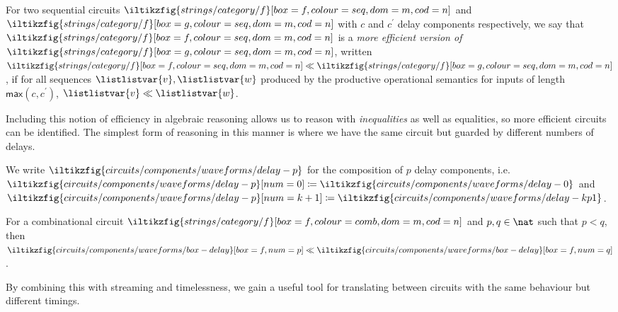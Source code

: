 \documentclass{lmcs}
\begin{document}
\begin{defi}
    For two sequential circuits \(
    \iltikzfig{strings/category/f}[box=f,colour=seq,dom=m,cod=n]
    \) and \(
    \iltikzfig{strings/category/f}[box=g,colour=seq,dom=m,cod=n]
    \) with \(c\) and \(c^\prime\) delay components respectively, we say that \(
    \iltikzfig{strings/category/f}[box=f,colour=seq,dom=m,cod=n]
    \) is a \emph{more efficient version of} \(
    \iltikzfig{strings/category/f}[box=g,colour=seq,dom=m,cod=n]
    \), written \(
    \iltikzfig{strings/category/f}[box=f,colour=seq,dom=m,cod=n]
    \ll
    \iltikzfig{strings/category/f}[box=g,colour=seq,dom=m,cod=n]
    \), if for all sequences \(\listlistvar{v},\listlistvar{w}\) produced by the
    productive operational semantics for inputs of length
    \(\mathsf{max}(c,c^\prime)\),  \(\listlistvar{v} \ll \listlistvar{w}\).
\end{defi}

Including this notion of efficiency in algebraic reasoning allows us to reason
with \emph{inequalities} as well as equalities, so more efficient circuits can
be identified.
The simplest form of reasoning in this manner is where we have the
same circuit but guarded by different numbers of delays.

\begin{nota}
    We write \(
    \iltikzfig{circuits/components/waveforms/delay-p}
    \) for the composition of \(p\) delay components, i.e.\ \(
    \iltikzfig{circuits/components/waveforms/delay-p}[num=0]
    \coloneqq
    \iltikzfig{circuits/components/waveforms/delay-0}
    \) and \(
    \iltikzfig{circuits/components/waveforms/delay-p}[num=k+1]
    \coloneqq
    \iltikzfig{circuits/components/waveforms/delay-kp1}
    \).
\end{nota}

\begin{lem}
    For a combinational circuit \(
    \iltikzfig{strings/category/f}[box=f,colour=comb,dom=m,cod=n]
    \) and \(p,q \in \nat\) such that \(p < q\), then \(
    \iltikzfig{circuits/components/waveforms/box-delay}[box=f,num=p]
    \ll
    \iltikzfig{circuits/components/waveforms/box-delay}[box=f,num=q]
    \).
\end{lem}

By combining this with streaming and timelessness, we gain a useful tool for
translating between circuits with the same behaviour but different timings.
\end{document}
